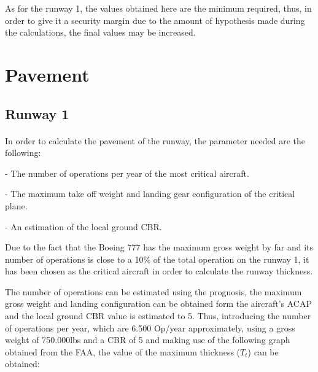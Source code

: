 	As for the runway 1, the values obtained here are the minimum required, thus, in order to give it a security margin due to the amount of hypothesis made during the calculations, the final values may be increased.
	
	\section{Pavement}
		\subsection{Runway 1}
		\paragraph{}In order to calculate the pavement of the runway, the parameter needed are the following:
	
		- The number of operations per year of the most critical aircraft.  
	
		- The maximum take off weight and landing gear configuration of the critical plane. 
	
		- An estimation of the local ground CBR.
	
		Due to the fact that the Boeing 777 has the maximum gross weight by far and its number of operations is close to a 10\% of the total operation on the runway 1, it has been chosen as the critical aircraft in order to calculate the runway thickness.
	
		The number of operations can be estimated using the prognosis, the maximum gross weight and landing configuration can be obtained form the aircraft's ACAP and the local ground CBR value is estimated to 5. Thus, introducing the number of operations per year, which are 6.500 Op/year approximately, using a gross weight of 750.000lbs and a CBR of 5 and making use of the following graph obtained from the FAA, the value of the maximum thickness (\(T_{t}\)) can be obtained:
	   
